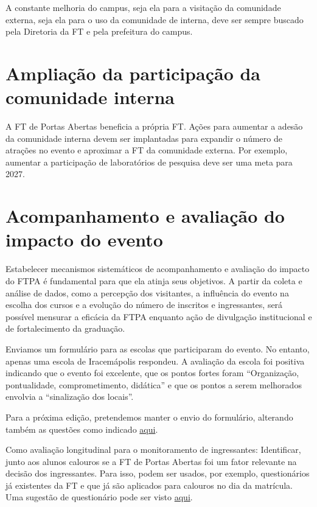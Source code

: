 \documentclass[
  letterpaper,
  DIV=11,
  numbers=noendperiod]{scrreprt}
\begin{document}
A constante melhoria do campus, seja ela para a visitação da comunidade
externa, seja ela para o uso da comunidade de interna, deve ser sempre
buscado pela Diretoria da FT e pela prefeitura do campus.

\section{Ampliação da participação da comunidade
interna}\label{ampliauxe7uxe3o-da-participauxe7uxe3o-da-comunidade-interna-1}

A FT de Portas Abertas beneficia a própria FT. Ações para aumentar a
adesão da comunidade interna devem ser implantadas para expandir o
número de atrações no evento e aproximar a FT da comunidade externa. Por
exemplo, aumentar a participação de laboratórios de pesquisa deve ser
uma meta para 2027.

\section{Acompanhamento e avaliação do impacto do
evento}\label{acompanhamento-e-avaliauxe7uxe3o-do-impacto-do-evento-1}

Estabelecer mecanismos sistemáticos de acompanhamento e avaliação do
impacto do FTPA é fundamental para que ela atinja seus objetivos. A
partir da coleta e análise de dados, como a percepção dos visitantes, a
influência do evento na escolha dos cursos e a evolução do número de
inscritos e ingressantes, será possível mensurar a eficácia da FTPA
enquanto ação de divulgação institucional e de fortalecimento da
graduação.

Enviamos um formulário para as escolas que participaram do evento. No
entanto, apenas uma escola de Iracemápolis respondeu. A avaliação da
escola foi positiva indicando que o evento foi excelente, que os pontos
fortes foram ``Organização, pontualidade, comprometimento, didática'' e
que os pontos a serem melhorados envolvia a ``sinalização dos locais''.

Para a próxima edição, pretendemos manter o envio do formulário,
alterando também as questões como indicado
\href{questionario-1.txt}{aqui}.

Como avaliação longitudinal para o monitoramento de ingressantes:
Identificar, junto aos alunos calouros se a FT de Portas Abertas foi um
fator relevante na decisão dos ingressantes. Para isso, podem ser
usados, por exemplo, questionários já existentes da FT e que já são
aplicados para calouros no dia da matrícula. Uma sugestão de
questionário pode ser visto \href{./questionario-2.txt}{aqui}.
\end{document}
